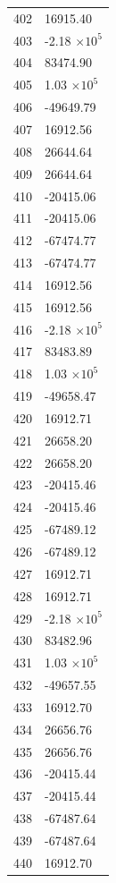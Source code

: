 \documentclass[a4paper,11pt]{article}
\begin{document}
\begin{center}
\begin{longtable}{|R{1.5cm}|R{2.5cm}|}
  402 &     16915.40 \\
  403 &        -2.18 $\times 10^{           5}$ \\
  404 &     83474.90 \\
  405 &         1.03 $\times 10^{           5}$ \\
  406 &    -49649.79 \\
  407 &     16912.56 \\
  408 &     26644.64 \\
  409 &     26644.64 \\
  410 &    -20415.06 \\
  411 &    -20415.06 \\
  412 &    -67474.77 \\
  413 &    -67474.77 \\
  414 &     16912.56 \\
  415 &     16912.56 \\
  416 &        -2.18 $\times 10^{           5}$ \\
  417 &     83483.89 \\
  418 &         1.03 $\times 10^{           5}$ \\
  419 &    -49658.47 \\
  420 &     16912.71 \\
  421 &     26658.20 \\
  422 &     26658.20 \\
  423 &    -20415.46 \\
  424 &    -20415.46 \\
  425 &    -67489.12 \\
  426 &    -67489.12 \\
  427 &     16912.71 \\
  428 &     16912.71 \\
  429 &        -2.18 $\times 10^{           5}$ \\
  430 &     83482.96 \\
  431 &         1.03 $\times 10^{           5}$ \\
  432 &    -49657.55 \\
  433 &     16912.70 \\
  434 &     26656.76 \\
  435 &     26656.76 \\
  436 &    -20415.44 \\
  437 &    -20415.44 \\
  438 &    -67487.64 \\
  439 &    -67487.64 \\
  440 &     16912.70 \\

\end{longtable}
\end{center}
\end{document}
